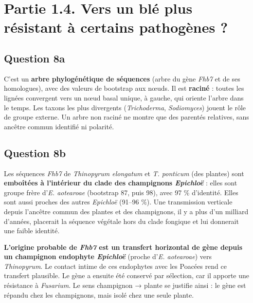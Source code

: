 \documentclass[11pt,a4paper]{article}
\begin{document}
\hypertarget{partie-1.4.-vers-un-bluxe9-plus-ruxe9sistant-uxe0-certains-pathoguxe8nes}{%
\section{Partie 1.4. Vers un blé plus résistant à certains pathogènes ?}\label{partie-1.4.-vers-un-bluxe9-plus-ruxe9sistant-uxe0-certains-pathoguxe8nes}}

\hypertarget{question-8a}{%
\subsection{Question 8a}\label{question-8a}}

C'est un \textbf{arbre phylogénétique de séquences} (arbre du gène \emph{Fhb7} et de ses homologues), avec des valeurs de bootstrap aux nœuds. Il est \textbf{raciné} : toutes les lignées convergent vers un nœud basal unique, à gauche, qui oriente l'arbre dans le temps. Les taxons les plus divergents (\emph{Trichoderma}, \emph{Sodiomyces}) jouent le rôle de groupe externe. Un arbre non raciné ne montre que des parentés relatives, sans ancêtre commun identifié ni polarité.

\hypertarget{question-8b}{%
\subsection{Question 8b}\label{question-8b}}

Les séquences \emph{Fhb7} de \emph{Thinopyrum elongatum} et \emph{T. ponticum} (des plantes) sont \textbf{emboîtées à l'intérieur du clade des champignons \emph{Epichloë}} : elles sont groupe frère d'\emph{E. aotearoae} (bootstrap 87, puis 98), avec 97 \% d'identité. Elles sont aussi proches des autres \emph{Epichloë} (91--96 \%). Une transmission verticale depuis l'ancêtre commun des plantes et des champignons, il y a plus d'un milliard d'années, placerait la séquence végétale hors du clade fongique et lui donnerait une faible identité.

\textbf{L'origine probable de \emph{Fhb7} est un transfert horizontal de gène depuis un champignon endophyte \emph{Epichloë}} (proche d'\emph{E. aotearoae}) vers \emph{Thinopyrum}. Le contact intime de ces endophytes avec les Poacées rend ce transfert plausible. Le gène a ensuite été conservé par sélection, car il apporte une résistance à \emph{Fusarium}. Le sens champignon → plante se justifie ainsi : le gène est répandu chez les champignons, mais isolé chez une seule plante.
\end{document}
